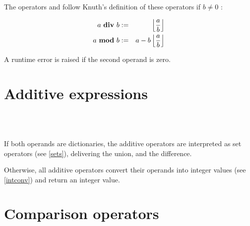 The operators  and  follow
Knuth's definition of these operators if $b \not= 0$ \cite{Knuth:divmod}:

\begin{eqnarray*}
   a ~ \mbox{\keyword{div}} ~ b & := &
      \left\lfloor \frac{a}{b} \right\rfloor \\
   a ~ \mbox{\keyword{mod}} ~ b & := &
      a - b \left\lfloor \frac{a}{b} \right\rfloor
\end{eqnarray*}

\noindent
A runtime error is raised if the second operand is zero.

\section{Additive expressions}

\begin{grammar}
      \produces {} \\
      \produces {}
         \lextoken{$+$}  \\
      \produces {}
         \lextoken{$-$} 
\end{grammar}

\noindent
If both operands are dictionaries, the additive operators
are interpreted as set operators (see \ref{sets}),
\token{+} delivering the union,
and \token{$-$} the difference.

Otherwise, all additive operators convert their operands into integer
values (see \ref{intconv}) and return an integer value.

\section{Comparison operators}

\begin{grammar}
      \produces {} \\
      \produces {}
         \lextoken{==}  \\
      \produces {}
         \lextoken{!=}  \\
      \produces {}
         \lextoken{<}  \\
      \produces {}
         \lextoken{<=}  \\
      \produces {}
         \lextoken{>=}  \\
      \produces {}
         \lextoken{>} 
\end{grammar}

